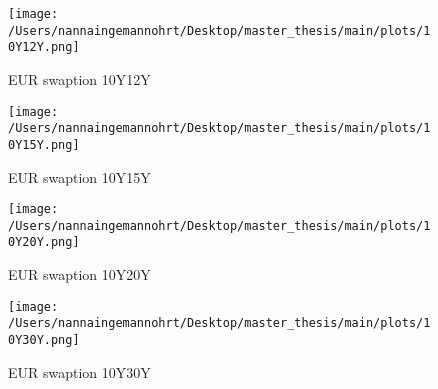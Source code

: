 \begin{figure}[H]
    \centering
    \begin{minipage}{0.5\textwidth}
        \texttt{[image: /Users/nannaingemannohrt/Desktop/master\_thesis/main/plots/10Y12Y.png]}
        \caption{EUR swaption 10Y12Y}
        \label{fig:10Y12Y}
    \end{minipage}\hfill 
    \begin{minipage}{0.5\textwidth}
        \texttt{[image: /Users/nannaingemannohrt/Desktop/master\_thesis/main/plots/10Y15Y.png]}
        \caption{EUR swaption 10Y15Y}
        \label{fig:10Y15Y}
    \end{minipage}

    \centering
    \begin{minipage}{0.5\textwidth}
        \texttt{[image: /Users/nannaingemannohrt/Desktop/master\_thesis/main/plots/10Y20Y.png]}
        \caption{EUR swaption 10Y20Y}
        \label{fig:10Y20Y}
    \end{minipage}\hfill 
    \begin{minipage}{0.5\textwidth}
        \texttt{[image: /Users/nannaingemannohrt/Desktop/master\_thesis/main/plots/10Y30Y.png]}
        \caption{EUR swaption 10Y30Y}
        \label{fig:10Y30Y}
    \end{minipage}
\end{figure}

